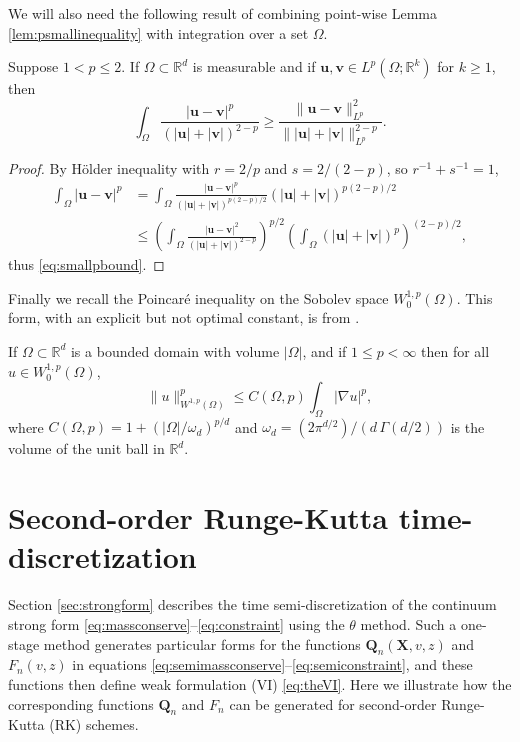 \documentclass[final,onefignum]{siamart190516}
\newcommand\bu{\mathbf{u}}
\newcommand\bv{\mathbf{v}}
\newcommand\bQ{\mathbf{Q}}
\newcommand\bX{\mathbf{X}}
\newcommand{\grad}{\nabla}
\newcommand\RR{\mathbb{R}}
\begin{document}
We will also need the following result of combining point-wise Lemma \ref{lem:psmallinequality} with integration over a set $\Omega$.

\begin{lemma} \label{lem:smallpbound}  Suppose $1<p\le 2$.  If $\Omega \subset \RR^d$ is measurable and if $\bu,\bv\in L^p(\Omega; \RR^k)$ for $k\ge 1$, then
\begin{equation}
    \int_\Omega \frac{|\bu-\bv|^p}{\left(|\bu|+|\bv|\right)^{2-p}} \ge \frac{\|\bu-\bv\|_{L^p}^2}{\big\||\bu|+|\bv|\big\|_{L^p}^{2-p}}. \label{eq:smallpbound}
\end{equation}
\end{lemma}

\begin{proof}  By H\"older inequality with $r=2/p$ and $s=2/(2-p)$, so $r^{-1}+s^{-1}=1$,
\begin{align*}
\int_\Omega |\bu - \bv|^p &= \int_\Omega \frac{|\bu-\bv|^p}{\left(|\bu|+|\bv|\right)^{p(2-p)/2}} \left(|\bu|+|\bv|\right)^{p(2-p)/2} \\
    &\le \left(\int_\Omega \frac{|\bu-\bv|^2}{\left(|\bu|+|\bv|\right)^{2-p}}\right)^{p/2} \left(\int_\Omega \left(|\bu|+|\bv|\right)^p\right)^{(2-p)/2},
\end{align*}
thus \eqref{eq:smallpbound}.
\end{proof}

Finally we recall the Poincar\'e inequality on the Sobolev space $W_0^{1,p}(\Omega)$.  This form, with an explicit but not optimal constant, is from \cite[section 7.8]{GilbargTrudinger2001}.

\begin{lemma} \label{lem:poincare}  If $\Omega\subset \RR^d$ is a bounded domain with volume $|\Omega|$, and if $1\le p<\infty$ then for all $u\in W_0^{1,p}(\Omega)$,
\begin{equation}
  \|u\|_{W^{1,p}(\Omega)}^p \le C(\Omega,p) \int_\Omega |\grad u|^p, \label{eq:poincare}
\end{equation}
where $C(\Omega,p)=1+(|\Omega|/\omega_d)^{p/d}$ and $\omega_d=(2 \pi^{d/2})/(d\,\Gamma(d/2))$ is the volume of the unit ball in $\RR^d$.
\end{lemma}


\section{Second-order Runge-Kutta time-discretization}  \label{app:rk2}  Section \ref{sec:strongform} describes the time semi-discretization of the continuum strong form \eqref{eq:massconserve}--\eqref{eq:constraint} using the $\theta$ method.  Such a one-stage method generates particular forms for the functions $\bQ_n(\bX,v,z)$ and $F_n(v,z)$ in equations \eqref{eq:semimassconserve}--\eqref{eq:semiconstraint}, and these functions then define weak formulation (VI) \eqref{eq:theVI}.  Here we illustrate how the corresponding functions $\bQ_n$ and $F_n$ can be generated for second-order Runge-Kutta (RK) schemes.
\end{document}
